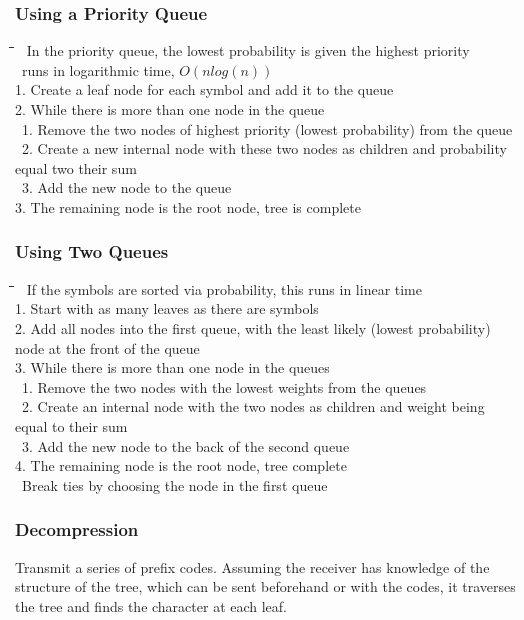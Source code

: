 \documentclass[10pt,letterpaper]{scrartcl}
\newcommand{\tbul}{\textbullet}
\newcommand{\tabDef}{\hspace{2em}\=\hspace{2em}\=\hspace{2em}\=\hspace{2em}\=\kill}
\begin{document}
\subsubsection{Using a Priority Queue}
\begin{tabbing}\tabDef
	\tbul\ In the priority queue, the lowest probability is given the highest priority \\
	\tbul\ runs in logarithmic time, $O(nlog(n))$ \\
	1. Create a leaf node for each symbol and add it to the queue \\
	2. While there is more than one node in the queue \\
	\>\ 1. Remove the two nodes of highest priority (lowest probability) from the queue \\
	\>\ 2. Create a new internal node with these two nodes as children and probability equal two their sum \\
	\>\ 3. Add the new node to the queue \\
	3. The remaining node is the root node, tree is complete
\end{tabbing}	
\subsubsection{Using Two Queues}
\begin{tabbing}\tabDef
	\tbul\ If the symbols are sorted via probability, this runs in linear time \\
	1. Start with as many leaves as there are symbols \\
	2. Add all nodes into the first queue, with the least likely (lowest probability) node at the front of the queue \\
	3. While there is more than one node in the queues \\
	\>\ 1. Remove the two nodes with the lowest weights from the queues \\
	\>\ 2. Create an internal node with the two nodes as children and weight being equal to their sum \\
	\>\ 3. Add the new node to the back of the second queue \\
	4. The remaining node is the root node, tree complete \\
	\tbul\ Break ties by choosing the node in the first queue \\
\end{tabbing}
\subsubsection{Decompression}
Transmit a series of prefix codes. Assuming the receiver has knowledge of the structure of the tree, which can be sent beforehand or with the codes, it traverses the tree and finds the character at each leaf. 
\end{document}
